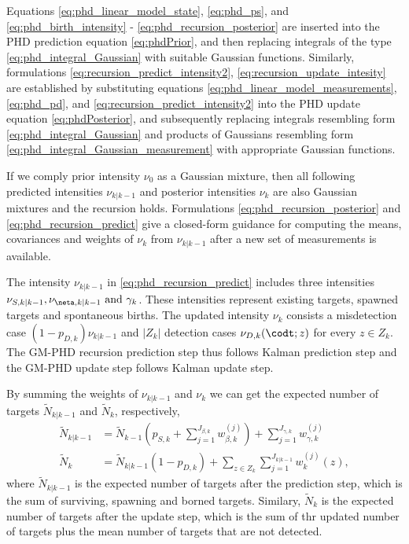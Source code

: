 Equations \eqref{eq:phd_linear_model_state}, \eqref{eq:phd_ps}, and \eqref{eq:phd_birth_intensity} - \eqref{eq:phd_recursion_posterior} are inserted into the PHD prediction equation \eqref{eq:phdPrior}, and then replacing integrals of the type \eqref{eq:phd_integral_Gaussian} with suitable Gaussian functions. Similarly, formulations \eqref{eq:recursion_predict_intensity2}, \eqref{eq:recursion_update_intesity} are established by substituting equations \eqref{eq:phd_linear_model_measurements}, \eqref{eq:phd_pd}, and \eqref{eq:recursion_predict_intensity2} into the PHD update equation \eqref{eq:phdPosterior}, and subsequently replacing integrals resembling form \eqref{eq:phd_integral_Gaussian} and products of Gaussians resembling form \eqref{eq:phd_integral_Gaussian_measurement} with appropriate Gaussian functions.

If we comply prior intensity $\nu_0$ as a Gaussian mixture, then all following predicted intensities $\nu_{k|k-1}$ and posterior intensities $\nu_k$ are also Gaussian mixtures and the recursion holds. Formulations \eqref{eq:phd_recursion_posterior} and \eqref{eq:phd_recursion_predict} give a closed-form guidance for computing the means, covariances and weights of $\nu_k$ from $\nu_{k|k-1}$ after a new set of measurements is available.

The intensity $\nu_{k|k-1}$ in \eqref{eq:phd_recursion_predict} includes three intensities $\nu_{S,k|k-1}, \nu_{\neta,k|k-1} \text{ and } \gamma_k$. These intensities represent existing targets, spawned targets and spontaneous births. The updated intensity $\nu_k$ consists a misdetection case $(1-p_{D,k})\nu_{k|k-1}$ and $|Z_k|$ detection cases $\nu_{D,k}(\codt;z)$ for every $z \in Z_k$. The GM-PHD recursion prediction step thus follows Kalman prediction step and the GM-PHD update step follows Kalman update step.

By summing the weights of $\nu_{k|k-1}$ and $\nu_k$ we can get the expected number of targets $\tilde{N}_{k|k-1}$ and $\tilde{N}_k$, respectively,
\begin{align}
    \tilde{N}_{k|k-1} &=\tilde{N}_{k-1} \left( p_{S,k} + \sum_{j=1}^{J_{\beta,k}} w_{\beta,k}^{(j)} \right) + \sum_{j=1}^{J_{\gamma,k}} w_{\gamma,k}^{(j)} \\
    \tilde{N}_k &= \tilde{N}_{k|k-1} (1 - p_{D,k}) + \sum_{z \in Z_k} \sum_{j=1}^{J_{k|k-1}} w_k^{(j)}(z),
\end{align}
where $\tilde{N}_{k|k-1}$ is the expected number of targets after the prediction step, which is the sum of surviving, spawning and borned targets. Similary, $\tilde{N}_k$ is the expected number of targets after the update step, which is the sum of thr updated number of targets plus the mean number of targets
that are not detected.

